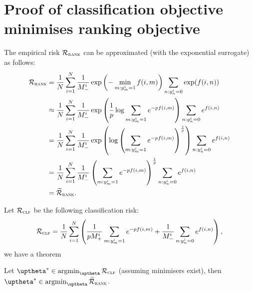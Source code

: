 \section{Proof of classification objective minimises ranking objective}

The empirical risk $\mathcal{R}_\textsc{rank}$ can be approximated (with the exponential surrogate) as follows:
\begin{equation*}
\begin{aligned}
\mathcal{R}_\textsc{rank} 
&= \frac{1}{N} \sum_{i=1}^N \frac{1}{M_-^i} \exp \left( -\min_{m: y_m^i = 1} f(i, m) \right) \sum_{n: y_n^i = 0} \exp(f(i, n)) \\
&\approx \frac{1}{N} \sum_{i=1}^N \frac{1}{M_-^i} \exp \left( \frac{1}{p} \log\sum_{m: y_m^i = 1} e^{-p f(i, m)} \right)
         \sum_{n: y_n^i = 0} e^{f(i, n)} \\
&= \frac{1}{N} \sum_{i=1}^N \frac{1}{M_-^i} \exp \left( \log \left( \sum_{m: y_m^i = 1} e^{-p f(i, m)} \right)^\frac{1}{p} \right) 
   \sum_{n: y_n^i = 0} e^{f(i, n)} \\
&= \frac{1}{N} \sum_{i=1}^N \frac{1}{M_-^i} \left( \sum_{m: y_m^i = 1} e^{-p f(i, m)} \right)^\frac{1}{p} \sum_{n: y_n^i = 0} e^{f(i, n)} \\
&= \widetilde{\mathcal{R}}_\textsc{rank}.
\end{aligned}
\end{equation*}

Let $\mathcal{R}_\textsc{clf}$ be the following classification risk:
\begin{equation*}
\mathcal{R}_\textsc{clf} 
= \frac{1}{N} \sum_{i=1}^N \left( 
  \frac{1}{p M_+^i} \sum_{m: y_m^i = 1} e^{-p f(i, m)} 
  + \frac{1}{M_-^i} \sum_{n: y_n^i = 0} e^{f(i, n)} \right),
\end{equation*}
we have a theorem
\begin{theorem}
Let $\uptheta^* \in \argmin_{\uptheta} \RCal_\textsc{clf}$ (assuming minimisers exist), 
then $\uptheta^* \in \argmin_{\uptheta} \widetilde\RCal_\textsc{rank}$.
\end{theorem}

